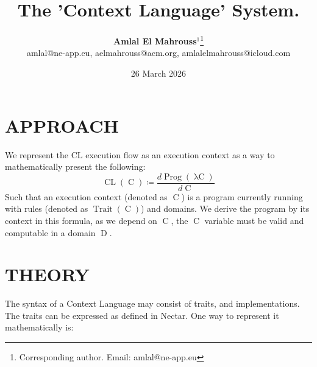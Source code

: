 \documentclass[10pt, twocolumn]{article}
\title{%
  \vspace{-1.5em}%
  \large\textbf{The 'Context Language' System.}%
}
\author{%
  \textbf{Amlal El Mahrouss}$^{1}$\thanks{Corresponding author. Email: amlal@ne-app.eu}
  \\amlal@ne-app.eu, aelmahrouss@acm.org, amlalelmahrouss@icloud.com\\[0.4em]
}
\date{%
  \small 26 March 2026
}
\theoremstyle{plain}
\theoremstyle{definition}
\theoremstyle{remark}
\begin{document}


\section{APPROACH}
\label{sec:cl-approach}

We represent the CL execution flow as an execution context as a way to mathematically present the following:
\begin{equation}
  \operatorname{CL}(\operatorname{C}) \coloneqq\frac{d\operatorname{Prog}(\operatorname{\lambda C})}{d\operatorname{C}}
\end{equation}
Such that an execution context (denoted as $\operatorname{C}$) is a program currently running with rules (denoted as $\operatorname{Trait}(\operatorname{C})$) and domains. We derive the program by its context in this formula, as we depend on $\operatorname{C}$, the $\operatorname{C}$ variable must be valid and computable in a domain $\operatorname{D}$.

\section{THEORY}
\label{sec:cl-theory}

The syntax of a Context Language may consist of traits, and implementations. The traits can be expressed as defined in Nectar. One way to represent it mathematically is:
\end{document}
